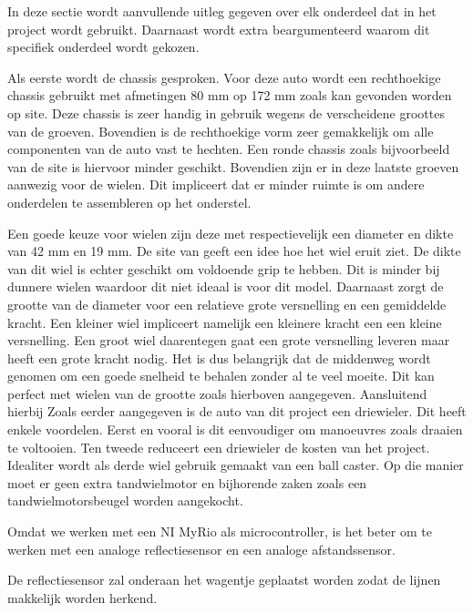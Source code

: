 \documentclass[a4paper,twoside,kulak]{kulakreport} %
\begin{document}
In deze sectie wordt aanvullende uitleg gegeven over elk onderdeel dat in het project wordt gebruikt. Daarnaast wordt extra beargumenteerd waarom dit specifiek onderdeel wordt gekozen.

Als eerste wordt de chassis gesproken. Voor deze auto wordt een rechthoekige chassis gebruikt met afmetingen 80 mm op 172 mm zoals kan gevonden worden op site. %
Deze chassis is zeer handig in gebruik wegens de verscheidene groottes van de groeven. Bovendien is de rechthoekige vorm zeer gemakkelijk om alle componenten van de auto vast te hechten. Een ronde chassis zoals bijvoorbeeld van de site %
is hiervoor minder geschikt. Bovendien zijn er in deze laatste groeven aanwezig voor de wielen. Dit impliceert dat er minder ruimte is om andere onderdelen te assembleren op het onderstel. 

Een goede keuze voor wielen zijn deze met respectievelijk een diameter en dikte van 42 mm en 19 mm. De site van %
geeft een idee hoe het wiel eruit ziet. De dikte van dit wiel is echter geschikt om voldoende grip te hebben. Dit is minder bij dunnere wielen waardoor dit niet ideaal is voor dit model. Daarnaast zorgt de grootte van de diameter voor een relatieve grote versnelling en een gemiddelde kracht. Een kleiner wiel impliceert namelijk een kleinere kracht een een kleine versnelling. Een groot wiel daarentegen gaat een grote versnelling leveren maar heeft een grote kracht nodig. Het is dus belangrijk dat de middenweg wordt genomen om een goede snelheid te behalen zonder al te veel moeite. Dit kan perfect met wielen van de grootte zoals hierboven aangegeven. Aansluitend hierbij 
Zoals eerder aangegeven is de auto van dit project een driewieler. Dit heeft enkele voordelen. Eerst en vooral is dit eenvoudiger om manoeuvres zoals draaien te voltooien. Ten tweede reduceert een driewieler de kosten van het project. Idealiter wordt als derde wiel gebruik gemaakt van een ball caster. Op die manier moet er geen extra tandwielmotor en bijhorende zaken zoals een tandwielmotorsbeugel worden aangekocht. %



Omdat we werken met een NI MyRio als microcontroller, is het beter om te werken met een analoge reflectiesensor en een analoge afstandssensor. %

De reflectiesensor zal onderaan het wagentje geplaatst worden zodat de lijnen makkelijk worden herkend.
\end{document}
